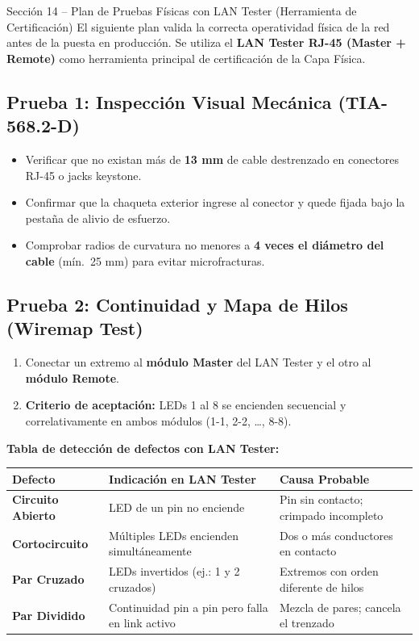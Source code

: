 \documentclass[12pt,a4paper]{article}
\begin{document}
\begin{cajanorma}{Sección 14 -- Plan de Pruebas Físicas con LAN Tester (Herramienta de Certificación)}
El siguiente plan valida la correcta operatividad física de la red antes de la puesta en producción. Se utiliza el \textbf{LAN Tester RJ-45 (Master + Remote)} como herramienta principal de certificación de la Capa Física.
\end{cajanorma}

\subsection{Prueba 1: Inspección Visual Mecánica (TIA-568.2-D)}
\begin{itemize}[leftmargin=1.5em,itemsep=2pt]
  \item Verificar que no existan más de \textbf{13 mm} de cable destrenzado en conectores RJ-45 o jacks keystone.
  \item Confirmar que la chaqueta exterior ingrese al conector y quede fijada bajo la pestaña de alivio de esfuerzo.
  \item Comprobar radios de curvatura no menores a \textbf{4 veces el diámetro del cable} (mín.\ 25 mm) para evitar microfracturas.
\end{itemize}

\subsection{Prueba 2: Continuidad y Mapa de Hilos (Wiremap Test)}
\begin{enumerate}[leftmargin=1.8em,itemsep=3pt]
  \item Conectar un extremo al \textbf{módulo Master} del LAN Tester y el otro al \textbf{módulo Remote}.
  \item \textbf{Criterio de aceptación:} LEDs 1 al 8 se encienden secuencial y correlativamente en ambos módulos (1-1, 2-2, \ldots, 8-8).
\end{enumerate}

\textbf{Tabla de detección de defectos con LAN Tester:}

\begin{tabularx}{\textwidth}{>{\bfseries\small}p{3cm}>{\small}p{4cm}>{\small}X}
  \toprule
  \rowcolor{colorPrincipal}
  \color{white}Defecto&\color{white}Indicación en LAN Tester&\color{white}Causa Probable\\
  \midrule
  Circuito Abierto  & LED de un pin no enciende                      & Pin sin contacto; crimpado incompleto \\
  Cortocircuito     & Múltiples LEDs encienden simultáneamente       & Dos o más conductores en contacto \\
  Par Cruzado       & LEDs invertidos (ej.: 1 y 2 cruzados)          & Extremos con orden diferente de hilos \\
  Par Dividido      & Continuidad pin a pin pero falla en link activo & Mezcla de pares; cancela el trenzado \\
  \bottomrule
\end{tabularx}
\end{document}

